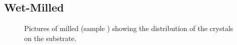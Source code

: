 	\subsection{Wet-Milled \CVD \Nds}\label{subsec::milled_nds}

		\begin{figure}[htp]
				\centering
			\caption[Distribution of \nds ontop of an \ir substrate]{Pictures of milled \nds (sample \insituH) showing the distribution of the \nd crystals on the \ir substrate.}
			 \label{fig::sem_millling}
		\end{figure}

